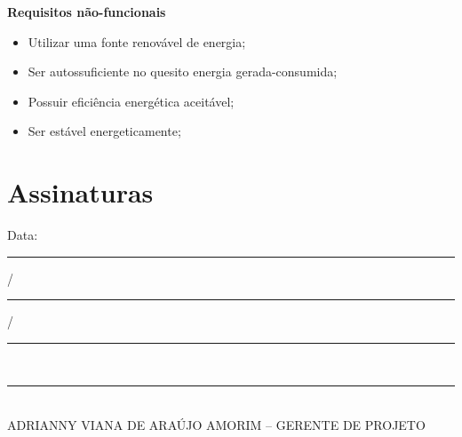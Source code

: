\begin{itemize}
	\textbf{Requisitos não-funcionais}
	\begin{itemize}
	  \item Utilizar uma fonte renovável de energia;
	  \item Ser autossuficiente no quesito energia gerada-consumida;
	  \item Possuir eficiência energética aceitável;
	  \item Ser estável energeticamente;
	\end{itemize}
	
    \end{itemize}
  
\section*{Assinaturas}

  \begin{center}
  Data: \rule{0.5cm}{0.1mm}/\rule{0.5cm}{0.1mm}/\rule{1cm}{0.1mm}     \\
  \rule{13cm}{0.1mm}\\
  ADRIANNY VIANA DE ARAÚJO AMORIM – GERENTE DE PROJETO\\


\end{center}
% 